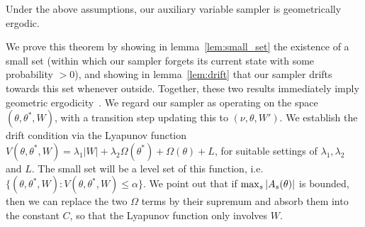 \begin{theorem}
Under the above assumptions, our auxiliary variable sampler is
geometrically ergodic.
\label{thm:geom_erg}
\end{theorem}
\noindent We prove this theorem by showing in lemma~\ref{lem:small_set} 
the existence of a small set (within which our sampler forgets its 
current state with some probability $>0$), and showing in
lemma~\ref{lem:drift} that our sampler drifts towards this set whenever 
outside. Together, these two results
immediately imply geometric ergodicity~\cite{meyntweed}.
We regard our sampler as operating on the space $(\theta,\theta^*,W)$, 
with a transition step updating this to $(\nu,\theta,W')$. 
We establish the drift condition via the Lyapunov function
$V(\theta,\theta^*,W) = \left. \lambda_1|W| + \lambda_2 \Omega(\theta^*) +
  \Omega(\theta) +L \right. $, for suitable settings of $\lambda_1,
  \lambda_2$ and $L$.
The small set will be a level set of this function, i.e.\ 
$\{(\theta,\theta^*,W): V(\theta,\theta^*,W) \le \alpha\}$.
We point out that if ${\max_s |A_s(\theta)|}$ is bounded, then we can replace
the two $\Omega$ terms by their supremum and absorb them into the 
constant $C$, so that the
Lyapunov function only involves $W$.

